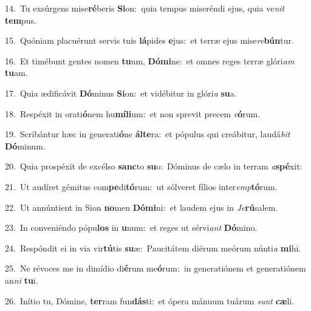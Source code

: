 {\numbfont\textcolor{\numbcolor}{14.}}~Tu exsúrgens mise\-\textbf{ré}\-beris \textbf{Si}\-on:~\star quia tempus miseréndi ejus, quia ve\textit{nit} \textbf{tem}\-pus.\par
{\numbfont\textcolor{\numbcolor}{15.}}~Quóniam placuérunt servis tuis \textbf{lá}\-pides \textbf{e}\-jus:~\star et terræ ejus mise\-\textit{re}\-\textbf{bún}tur.\par
{\numbfont\textcolor{\numbcolor}{16.}}~Et timébunt gentes nomen \textbf{tu}\-um, \textbf{Dó}\-\textbf{mi}ne:~\star et omnes reges terræ glóri\textit{am} \textbf{tu}\-am.\par
{\numbfont\textcolor{\numbcolor}{17.}}~Quia ædificávit \textbf{Dó}\-minus \textbf{Si}\-on:~\star et vidébitur in glóri\textit{a} \textbf{su}\-a.\par
{\numbfont\textcolor{\numbcolor}{18.}}~Respéxit in orati\-\textbf{ó}\-nem hu\-\textbf{mí}\-\textbf{li}um:~\star et non sprevit precem \textit{e}\-\textbf{ó}rum.\par
{\numbfont\textcolor{\numbcolor}{19.}}~Scribántur hæc in generati\-\textbf{ó}\-ne \textbf{ál}\-\textbf{te}ra:~\star et pópulus qui creábitur, laudá\textit{bit} \textbf{Dó}\-minum.\par
{\numbfont\textcolor{\numbcolor}{20.}}~Quia prospéxit de excélso \textbf{sanc}\-to \textbf{su}\-o:~\star Dóminus de cælo in terram \textit{a}\-\textbf{spé}xit:\par
{\numbfont\textcolor{\numbcolor}{21.}}~Ut audíret gémitus com\-\textbf{pe}\-di\-\textbf{tó}\-rum:~\star ut sólveret fílios inter\-\textit{emp}\-\textbf{tó}rum.\par
{\numbfont\textcolor{\numbcolor}{22.}}~Ut annúntient in Sion \textbf{no}\-men \textbf{Dó}\-\textbf{mi}ni:~\star et laudem ejus in \textit{Je}\-\textbf{rú}salem.\par
{\numbfont\textcolor{\numbcolor}{23.}}~In conveniéndo pópu\textbf{los} in \textbf{u}\-num:~\star et reges ut sérvi\textit{ant} \textbf{Dó}\-mino.\par
{\numbfont\textcolor{\numbcolor}{24.}}~Respóndit ei in via vir\-\textbf{tú}\-tis \textbf{su}\-æ:~\star Paucitátem diérum meórum núnti\textit{a} \textbf{mi}\-hi.\par
{\numbfont\textcolor{\numbcolor}{25.}}~Ne révoces me in dimídio di\-\textbf{é}\-rum me\-\textbf{ó}\-rum:~\star in generatiónem et generatiónem an\textit{ni} \textbf{tu}\-i.\par
{\numbfont\textcolor{\numbcolor}{26.}}~Inítio tu, Dómine, \textbf{ter}\-ram fun\-\textbf{dás}\-ti:~\star et ópera mánuum tuárum \textit{sunt} \textbf{cæ}\-li.\par
